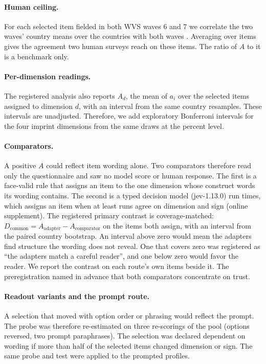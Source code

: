 \paragraph{Human ceiling.} For each selected item fielded in both WVS waves 6 and 7 we correlate the two waves' country means over the  countries with both waves \citep{wvsts2022}. Averaging over items gives the agreement two human surveys reach on these items. The ratio of $A$ to it is a benchmark only.

\paragraph{Per-dimension readings.} The registered analysis also reports $A_d$, the mean of $a_i$ over the selected items assigned to dimension $d$, with an interval from the same country resamples. These intervals are unadjusted. Therefore, we add exploratory Bonferroni intervals for the four imprint dimensions from the same draws at the  percent level.

\paragraph{Comparators.} A positive $A$ could reflect item wording alone. Two comparators therefore read only the questionnaire and saw no model score or human response. The first is a face-valid rule that assigns an item to the one dimension whose construct words its wording contains. The second is a typed decision model (jev-1.13.0) run  times, which assigns an item when at least  runs agree on dimension and sign (online supplement). The registered primary contrast is coverage-matched: $D_{\mathrm{common}}=A_{\mathrm{adapter}}-A_{\mathrm{comparator}}$ on the items both assign, with an interval from the paired country bootstrap. An interval above zero would mean the adapters find structure the wording does not reveal. One that covers zero was registered as ``the adapters match a careful reader'', and one below zero would favor the reader. We report the contrast on each route's own items beside it. The preregistration named in advance that both comparators concentrate on trust.

\paragraph{Readout variants and the prompt route.} A selection that moved with option order or phrasing would reflect the prompt. The probe was therefore re-estimated on three re-scorings of the pool (options reversed, two prompt paraphrases). The selection was declared dependent on wording if more than half of the selected items changed dimension or sign. The same probe and test were applied to the  prompted profiles.

